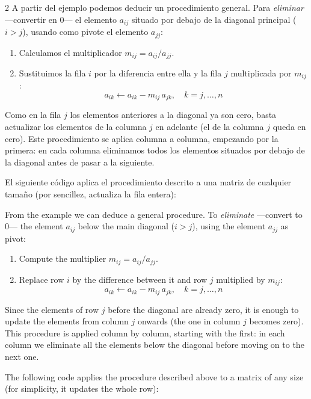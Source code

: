 \begin{paracol}{2}
A partir del ejemplo podemos deducir un procedimiento general. Para \emph{eliminar} ---convertir en 0--- el elemento $a_{ij}$ situado por debajo de la diagonal principal ($i>j$), usando como pivote el elemento $a_{jj}$:
\begin{enumerate}
\item Calculamos el multiplicador $m_{ij}=a_{ij}/a_{jj}$.
\item Sustituimos la fila $i$ por la diferencia entre ella y la fila $j$ multiplicada por $m_{ij}$:
\begin{equation*}
a_{ik} \leftarrow a_{ik}-m_{ij}\, a_{jk}, \quad k=j,\dots,n
\end{equation*}
\end{enumerate}
Como en la fila $j$ los elementos anteriores a la diagonal ya son cero, basta actualizar los elementos de la columna $j$ en adelante (el de la columna $j$ queda en cero). Este procedimiento se aplica columna a columna, empezando por la primera: en cada columna eliminamos todos los elementos situados por debajo de la diagonal antes de pasar a la siguiente.

El siguiente código aplica el procedimiento descrito a una matriz de cualquier tamaño (por sencillez, actualiza la fila entera):

\switchcolumn

From the example we can deduce a general procedure. To \emph{eliminate} ---convert to 0--- the element $a_{ij}$ below the main diagonal ($i>j$), using the element $a_{jj}$ as pivot:
\begin{enumerate}
\item Compute the multiplier $m_{ij}=a_{ij}/a_{jj}$.
\item Replace row $i$ by the difference between it and row $j$ multiplied by $m_{ij}$:
\begin{equation*}
a_{ik} \leftarrow a_{ik}-m_{ij}\, a_{jk}, \quad k=j,\dots,n
\end{equation*}
\end{enumerate}
Since the elements of row $j$ before the diagonal are already zero, it is enough to update the elements from column $j$ onwards (the one in column $j$ becomes zero). This procedure is applied column by column, starting with the first: in each column we eliminate all the elements below the diagonal before moving on to the next one.

The following code applies the procedure described above to a matrix of any size (for simplicity, it updates the whole row):
\end{paracol}

